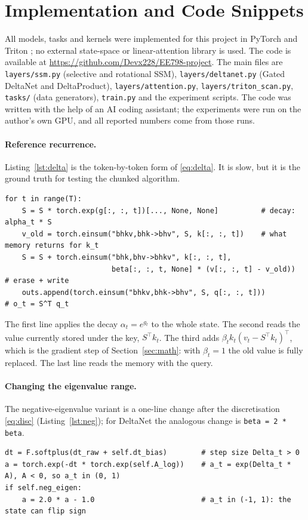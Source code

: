 \section{Implementation and Code Snippets}
\label{sec:impl}

All models, tasks and kernels were implemented for this project in PyTorch and Triton
\citep{tillet2019triton}; no external state-space or linear-attention library is used. The code is available
at \url{https://github.com/Devx228/EE798-project}. The main files are \texttt{layers/ssm.py} (selective and
rotational SSM), \texttt{layers/deltanet.py} (Gated DeltaNet and DeltaProduct), \texttt{layers/attention.py},
\texttt{layers/triton\_scan.py}, \texttt{tasks/} (data generators), \texttt{train.py} and the experiment
scripts. The code was written with the help of an AI coding assistant; the experiments were run on the
author's own GPU, and all reported numbers come from those runs.

\paragraph{Reference recurrence.} Listing~\ref{lst:delta} is the token-by-token form of
\eqref{eq:delta}. It is slow, but it is the ground truth for testing the chunked algorithm.
\begin{lstlisting}[caption={Reference gated delta rule (\texttt{layers/deltanet.py}).},label={lst:delta}]
for t in range(T):
    S = S * torch.exp(g[:, :, t])[..., None, None]          # decay: alpha_t * S
    v_old = torch.einsum("bhkv,bhk->bhv", S, k[:, :, t])    # what memory returns for k_t
    S = S + torch.einsum("bhk,bhv->bhkv", k[:, :, t],
                         beta[:, :, t, None] * (v[:, :, t] - v_old))  # erase + write
    outs.append(torch.einsum("bhkv,bhk->bhv", S, q[:, :, t]))         # o_t = S^T q_t
\end{lstlisting}
The first line applies the decay $\alpha_t=e^{g_t}$ to the whole state. The second reads the value currently
stored under the key, $S^\top k_t$. The third adds $\beta_t k_t(v_t-S^\top k_t)^\top$, which is the
gradient step of Section~\ref{sec:math}: with $\beta_t=1$ the old value is fully replaced. The last line
reads the memory with the query.

\paragraph{Changing the eigenvalue range.} The negative-eigenvalue variant is a one-line change after the
discretisation \eqref{eq:disc} (Listing~\ref{lst:neg}); for DeltaNet the analogous change is
\texttt{beta = 2 * beta}.
\begin{lstlisting}[caption={Decay of the selective SSM (\texttt{layers/ssm.py}).},label={lst:neg}]
dt = F.softplus(dt_raw + self.dt_bias)        # step size Delta_t > 0
a = torch.exp(-dt * torch.exp(self.A_log))    # a_t = exp(Delta_t * A), A < 0, so a_t in (0, 1)
if self.neg_eigen:
    a = 2.0 * a - 1.0                         # a_t in (-1, 1): the state can flip sign
\end{lstlisting}

